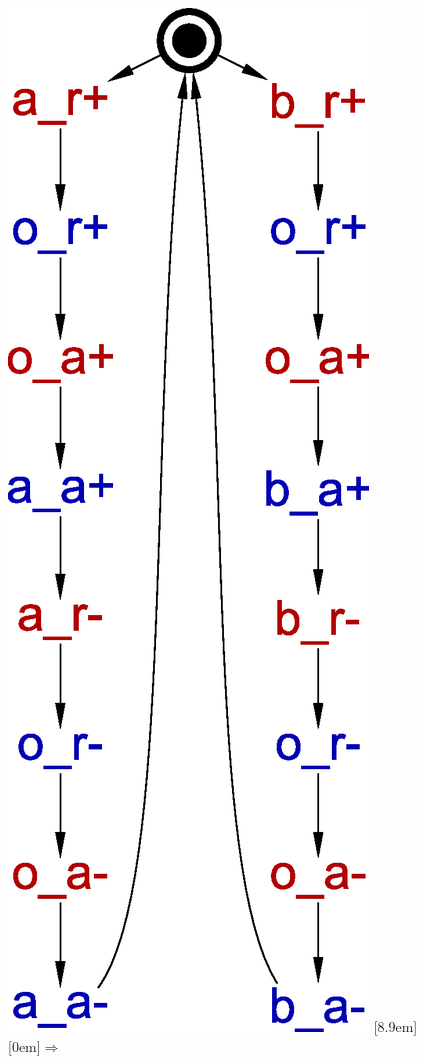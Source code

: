 \begin{figure}[!tb]
    \centering
    {}%
    \hfill%
    \includegraphics[scale=0.3]{EXPERIMENTS/stg/mix_full}%
    \hfill%
    \raisebox{8.9em}[8.9em][0em]{\Large$\Rightarrow$}

\end{figure}
